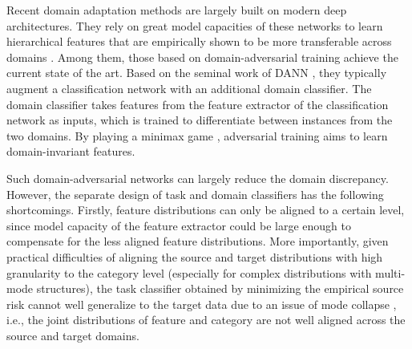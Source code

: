 \documentclass[letterpaper]{article} \usepackage{aaai20}  \usepackage{times}  \usepackage{helvet} \usepackage{courier}  \usepackage[hyphens]{url}  \usepackage{graphicx} \urlstyle{rm} \def\UrlFont{\rm}  \usepackage{graphicx}  \frenchspacing  \setlength{\pdfpagewidth}{8.5in}  \setlength{\pdfpageheight}{11in}
\begin{document}
Recent domain adaptation methods are largely built on modern deep architectures. They rely on great model capacities of these networks to learn hierarchical features that are empirically shown to be more transferable across domains \cite{transferability_theory,metafgnet}. Among them, those based on domain-adversarial training \cite{dann,tada} achieve the current state of the art. Based on the seminal work of DANN \cite{dann}, they typically augment a classification network with an additional domain classifier. The domain classifier takes features from the feature extractor of the classification network as inputs, which is trained to differentiate between instances from the two domains. By playing a minimax game \cite{gans}, adversarial training aims to learn domain-invariant features.

Such domain-adversarial networks can largely reduce the domain discrepancy. However, the separate design of task and domain classifiers has the following shortcomings. Firstly, feature distributions can only be aligned to a certain level, since model capacity of the feature extractor could be large enough to compensate for the less aligned feature distributions. More importantly, given practical difficulties of aligning the source and target distributions with high granularity to the category level (especially for complex distributions with multi-mode structures), the task classifier obtained by minimizing the empirical source risk cannot well generalize to the target data due to an issue of mode collapse \cite{idda,dann_ca}, i.e., the joint distributions of feature and category are not well aligned across the source and target domains.
\end{document}
